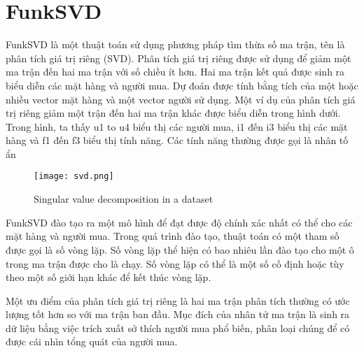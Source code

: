 \section{FunkSVD}
FunkSVD là một thuật toán sử dụng phương pháp tìm thừa số ma trận, tên là phân tích giá trị riêng (SVD). Phân tích giá trị riêng được sử dụng để giảm một ma trận đến hai ma trận với số chiều ít hơn. Hai ma trận kết quả được sinh ra biểu diễn các mặt hàng và người mua. Dự đoán được tính bằng tích của một hoặc nhiều vector mặt hàng và một vector người sử dụng. Một ví dụ của phân tích giá trị riêng giảm một trận đến hai ma trận khác được biểu diễn trong hình dưới. Trong hình, ta thấy u1 to u4 biểu thị các người mua, i1 đến i3 biểu thị các mặt hàng và f1 đến f3 biểu thị tính năng. Các tính năng thường được gọi là nhân tố ẩn
\begin{center}
\begin{figure}[H]
	\centering
	\texttt{[image: svd.png]}
	\caption{Singular value decomposition in a dataset}
	\label{fig:SVD}
\end{figure}
\end{center}
FunkSVD đào tạo ra một mô hình để đạt được độ chính xác nhất có thể cho các mặt hàng và người mua. Trong quá trình đào tạo, thuật toán có một tham số được gọi là số vòng lặp. Số vòng lặp thể hiện có bao nhiêu lần đào tạo cho một ô trong ma trận được cho là chạy. Số vòng lặp có thể là một số cố định hoặc tùy theo một số giới hạn khác để kết thúc vòng lặp.

Một ưu điểm của phân tích giá trị riêng là hai ma trận phân tích thường có ước lượng tốt hơn so với ma trận ban đầu. Mục đích của nhân tử ma trận là sinh ra dữ liệu bằng việc trích xuất sở thích người mua phổ biến, phân loại chúng để có được cái nhìn tổng quát của người mua.